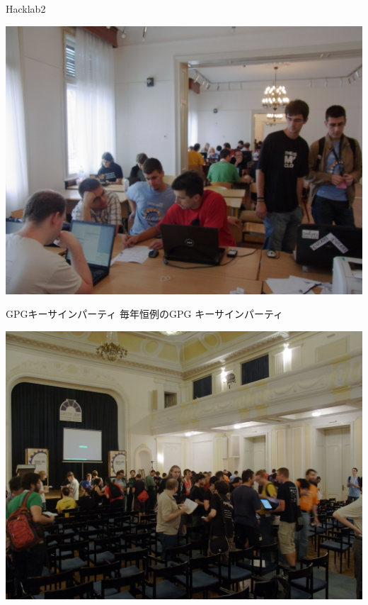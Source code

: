 \begin{frame}{Hacklab2}
\begin{center}
\includegraphics[width=0.9\hsize]{image201108/debconf11_hacklab2.jpg}
\end{center}
\end{frame}


\begin{frame}{GPGキーサインパーティ}
毎年恒例のGPG キーサインパーティ
\begin{center}
\includegraphics[width=0.9\hsize]{image201108/debconf11_ksp.jpg}
\end{center}
\end{frame}


